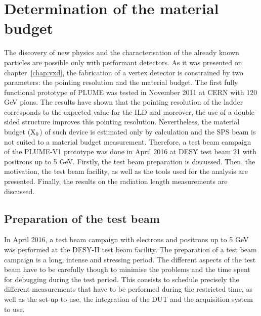 \chapter{Determination of the material budget}
\label{chap:X0}

  The discovery of new physics and the characterisation of the already known particles are possible only with performant detectors.
  As it was presented on chapter~\ref{chap:vxd}, the fabrication of a vertex detector is constrained by two parameters: the pointing resolution and the material budget.
  The first fully functional prototype of \gls{PLUME} was tested in November 2011 at CERN with 120 GeV pions.
  The results have shown that the pointing resolution of the ladder corresponds to the expected value for the \gls{ILD} and moreover, the use of a double-sided structure improves this pointing resolution. 
  Nevertheless, the material budget ($\rm{X}_0$) of such device is estimated only by calculation and the SPS beam is not suited to a material budget measurement.
  Therefore, a test beam campaign of the PLUME-V1 prototype was done in April 2016 at DESY test beam 21 with positrons up to 5 GeV.
  Firstly, the test beam preparation is discussed.
  Then, the motivation, the test beam facility, as well as the tools used for the analysis are presented.
  Finally, the results on the radiation length measurements are discussed.


\minitoc

  \section{Preparation of the test beam}

  In April 2016, a test beam campaign with electrons and positrons up to 5 GeV was performed at the DESY-II test beam facility.
  The preparation of a test beam campaign is a long, intense and stressing period.
  The different aspects of the test beam have to be carefully though to minimise the problems and the time spent for debugging during the test period.
  This consists to schedule precisely the different measurements that have to be performed during the restricted time, as well as the set-up to use, the integration of the \gls{DUT} and the acquisition system to use.
  
